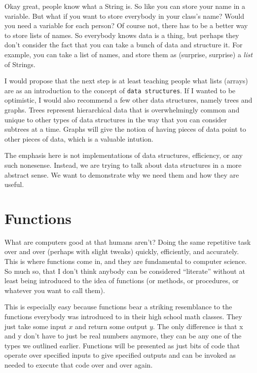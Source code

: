 \documentclass[12pt]{article}
\begin{document}
      Okay great, people know what a String is. So like you can store your name in a variable. But what if you want to store everybody in your class's name? Would you need a variable for each person? Of course not, there has to be a better way to store lists of names. So everybody knows data is a thing, but perhaps they don't consider the fact that you can take a bunch of data and structure it. For example, you can take a list of names, and store them as (surprise, surprise) a \textit{list} of Strings. 

      I would propose that the next step is at least teaching people what lists (arrays) are as an introduction to the concept of \texttt{data structures}. If I wanted to be optimistic, I would also recommend a few other data structures, namely trees and graphs. Trees represent hierarchical data that is overwhelmingly common and unique to other types of data structures in the way that you can consider subtrees at a time. Graphs will give the notion of having pieces of data point to other pieces of data, which is a valuable intution.  

      The emphasis here is not implementations of data structures, efficiency, or any such nonesense. Instead, we are trying to talk about data structures in a more abstract sense. We want to demonstrate why we need them and how they are useful.

    \section{Functions}

      What are computers good at that humans aren't? Doing the same repetitive task over and over (perhaps with slight tweaks) quickly, efficiently, and accurately. This is where functions come in, and they are fundamental to computer science. So much so, that I don't think anybody can be considered ``literate'' without at least being introduced to the idea of functions (or methods, or procedures, or whatever you want to call them). 

      This is especially easy because functions bear a striking resemblance to the functions everybody was introduced to in their high school math classes. They just take some input $x$ and return some output $y$. The only difference is that x and y don't have to just be real numbers anymore, they can be any one of the types we outlined earlier. Functions will be presented as just bits of code that operate over specified inputs to give specified outputs and can be invoked as needed to execute that code over and over again.  
\end{document}
